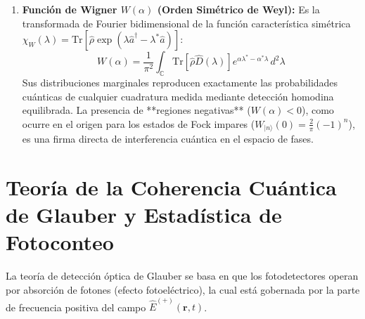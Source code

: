 \documentclass[11pt,a4paper]{book}
\begin{document}
\begin{enumerate}
    \item \textbf{Función de Wigner $W(\alpha)$ (Orden Simétrico de Weyl):}
    Es la transformada de Fourier bidimensional de la función característica simétrica $\chi_W(\lambda) = \text{Tr}\left[\hat{\rho} \exp(\lambda \hat{a}^\dagger - \lambda^* \hat{a})\right]$:
    \begin{equation}
    W(\alpha) = \frac{1}{\pi^2} \int_{\mathbb{C}} \text{Tr}\left[ \hat{\rho} \hat{D}(\lambda) \right] e^{\alpha\lambda^* - \alpha^*\lambda} \, d^2\lambda
    \end{equation}
    Sus distribuciones marginales reproducen exactamente las probabilidades cuánticas de cualquier cuadratura medida mediante detección homodina equilibrada. La presencia de **regiones negativas** ($W(\alpha) < 0$), como ocurre en el origen para los estados de Fock impares ($W_{|n\rangle}(0) = \frac{2}{\pi}(-1)^n$), es una firma directa de interferencia cuántica en el espacio de fases.
\end{enumerate}

\section[Coherencia cuántica y fotoconteo]{Teoría de la Coherencia Cuántica de Glauber y Estadística de Fotoconteo}

La teoría de detección óptica de Glauber se basa en que los fotodetectores operan por absorción de fotones (efecto fotoeléctrico), la cual está gobernada por la parte de frecuencia positiva del campo $\hat{E}^{(+)}(\mathbf{r},t)$.
\end{document}

